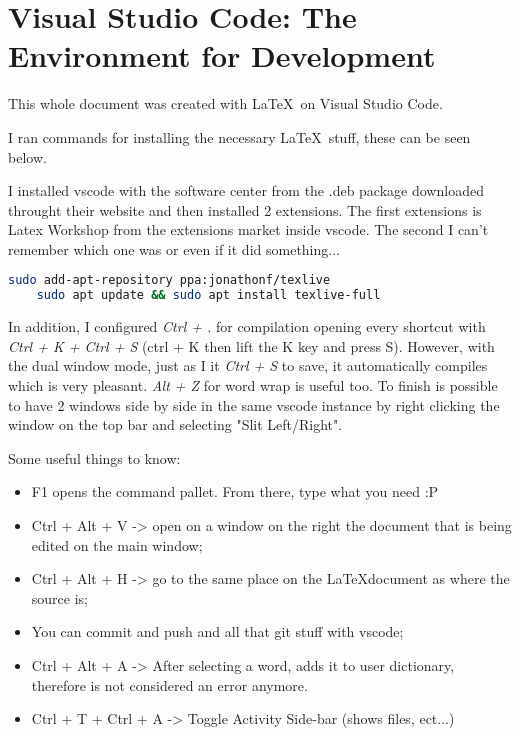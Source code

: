 

\pagebreak
\section{Visual Studio Code: The Environment for Development}

\par This whole document was created with \LaTeX \ on Visual Studio Code. 
\par I ran commands for installing the necessary \LaTeX \ stuff, these can be seen below.
\par I installed vscode with the software center from the .deb package downloaded throught their website and then installed 2 extensions. The first extensions is Latex Workshop from the extensions market inside vscode. The second I can't remember which one was or even if it did something...

\vspace{.5cm}
\begin{lstlisting}[language=bash] 
    sudo add-apt-repository ppa:jonathonf/texlive
    sudo apt update && sudo apt install texlive-full
\end{lstlisting}
\vspace{.5cm}

\par In addition, I configured \textit{Ctrl + .} for compilation opening every shortcut with \textit{Ctrl + K + Ctrl + S} (ctrl + K then lift the K key and press S). However, with the dual window mode, just as I it \textit{Ctrl + S} to save, it automatically compiles which is very pleasant.
\textit{Alt + Z} for word wrap is useful too.
To finish is possible to have 2 windows side by side in the same vscode instance by right clicking the window on the top bar and selecting "Slit Left/Right".

\vspace{1cm}
\par Some useful things to know:
\begin{itemize}
    \item F1 opens the command pallet. From there, type what you need :P
    \item Ctrl + Alt + V -> open on a window on the right the document that is being edited on the main window;
    \item Ctrl + Alt + H -> go to the same place on the \LaTeX document as where the source is;
    \item You can commit and push and all that git stuff with vscode;
    \item Ctrl + Alt + A -> After selecting a word, adds it to user dictionary, therefore is not considered an error anymore.
    \item Ctrl + T + Ctrl + A -> Toggle Activity Side-bar (shows files, ect...)
\end{itemize}
















